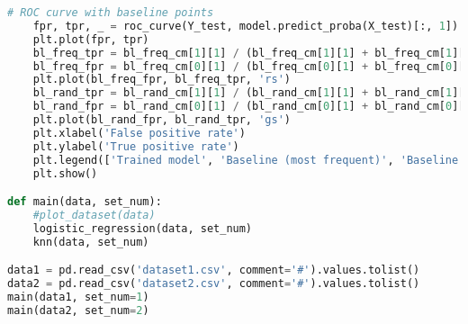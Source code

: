 \documentclass[12pt]{article}
\begin{document}
\begin{lstlisting}[language=Python]
    # ROC curve with baseline points
    fpr, tpr, _ = roc_curve(Y_test, model.predict_proba(X_test)[:, 1])
    plt.plot(fpr, tpr)
    bl_freq_tpr = bl_freq_cm[1][1] / (bl_freq_cm[1][1] + bl_freq_cm[1][0])
    bl_freq_fpr = bl_freq_cm[0][1] / (bl_freq_cm[0][1] + bl_freq_cm[0][0])
    plt.plot(bl_freq_fpr, bl_freq_tpr, 'rs')
    bl_rand_tpr = bl_rand_cm[1][1] / (bl_rand_cm[1][1] + bl_rand_cm[1][0])
    bl_rand_fpr = bl_rand_cm[0][1] / (bl_rand_cm[0][1] + bl_rand_cm[0][0])
    plt.plot(bl_rand_fpr, bl_rand_tpr, 'gs')
    plt.xlabel('False positive rate')
    plt.ylabel('True positive rate')
    plt.legend(['Trained model', 'Baseline (most frequent)', 'Baseline (random)'])
    plt.show()

def main(data, set_num):
    #plot_dataset(data)
    logistic_regression(data, set_num)
    knn(data, set_num)

data1 = pd.read_csv('dataset1.csv', comment='#').values.tolist()
data2 = pd.read_csv('dataset2.csv', comment='#').values.tolist()
main(data1, set_num=1)
main(data2, set_num=2)
\end{lstlisting}
\end{document}

